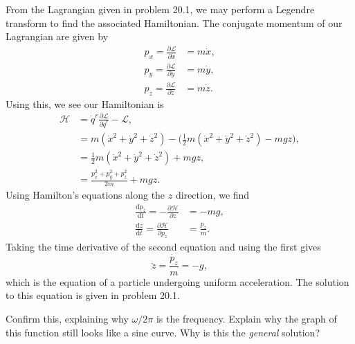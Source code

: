 \documentclass[../road-to-reality.tex]{subfiles}
\begin{document}
\begin{questions}
  \begin{solution}
    From the Lagrangian given in problem 20.1, we may perform a Legendre
    transform to find the associated Hamiltonian. The conjugate momentum of our
    Lagrangian are given by
    \begin{align*}
      p_x = \frac{\partial\mathcal{L}}{\partial{\dot{x}}} &= m\dot{x}, \\
      p_y = \frac{\partial\mathcal{L}}{\partial{\dot{y}}} &= m\dot{y}, \\
      p_z = \frac{\partial\mathcal{L}}{\partial{\dot{z}}} &= m\dot{z}.
    \end{align*}
    Using this, we see our Hamiltonian is
    \begin{align*}
      \mathcal{H} &= \dot{q}^r\frac{\partial\mathcal{L}}{\partial\dot{q}^r} - \mathcal{L}, \\
                  &= m(\dot{x}^2 + \dot{y}^2 + \dot{z}^2) - \Big(\frac{1}{2}m(\dot{x}^2 + \dot{y}^2 + \dot{z}^2) - mgz\Big), \\
                  &= \frac{1}{2}m(\dot{x}^2 + \dot{y}^2 + \dot{z}^2) + mgz, \\
                  &= \frac{p_x^2 + p_y^2 + p_z^2}{2m} + mgz.
    \end{align*}
    Using Hamilton's equations along the $z$ direction, we find
    \begin{align*}
      \frac{\mathrm{d}p_z}{\mathrm{d}t} = -\frac{\partial\mathcal{H}}{\partial{z}} &= -mg, \\
      \frac{\mathrm{d}z}{\mathrm{d}t} = \frac{\partial\mathcal{H}}{\partial{p_z}} &= \frac{p_z}{m}.
    \end{align*}
    Taking the time derivative of the second equation and using the first gives
    \[
      \ddot{z} = \frac{\dot{p_z}}{m} = -g,
    \]
    which is the equation of a particle undergoing uniform acceleration. The
    solution to this equation is given in problem 20.1.
  \end{solution}

\question Confirm this, explaining why $\omega/2\pi$ is the frequency. Explain
  why the graph of this function still looks like a sine curve. Why is this the
  \textit{general} solution?


\end{questions}
\end{document}
